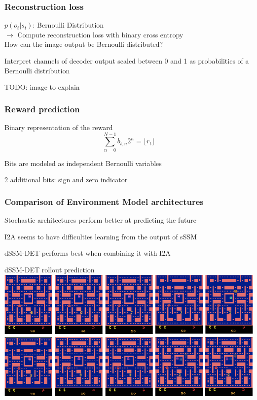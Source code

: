 \begin{frame}
	\frametitle{Reconstruction loss}
	$p(o_t|s_t)$: Bernoulli Distribution \\
        $\rightarrow$ Compute reconstruction loss with binary cross entropy\\
        \vspace{10mm}
	How can the image output be Bernoulli distributed?
        \begin{PraesentationAufzaehlung}
        	\item Interpret channels of decoder output scaled between 0 and 1 as probabilities of a Bernoulli distribution
        	
        \end{PraesentationAufzaehlung}
        TODO: image to explain
\end{frame}

\begin{frame}
	\frametitle{Reward prediction}
	\begin{PraesentationAufzaehlung}
		\item Binary representation of the reward
		\begin{equation}
			\sum_{n=0}^{N-1}b_{t,n}2^n = \lfloor r_t \rfloor
		\end{equation}
		\item Bits are modeled as independent Bernoulli variables
		\item 2 additional bits: sign and zero indicator
	\end{PraesentationAufzaehlung}
\end{frame}


\begin{frame}
	\frametitle{Comparison of Environment Model architectures}
	\begin{PraesentationAufzaehlung}
		\item Stochastic architectures perform better at predicting the future\\
		\item I2A seems to have difficulties learning from the output of sSSM
		\item dSSM-DET performs best when combining it with I2A
	\end{PraesentationAufzaehlung}
\end{frame}




\begin{frame}{dSSM-DET rollout prediction}
    \includegraphics[width=\textwidth]{./latent_i2a_images/dSSM_rollout_prediction.png}
\end{frame}

